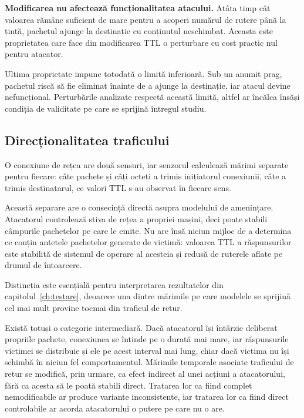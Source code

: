 \textbf{Modificarea nu afectează funcționalitatea atacului.} Atâta timp cât valoarea rămâne suficient de mare pentru a acoperi numărul de rutere până la țintă, pachetul ajunge la destinație cu conținutul neschimbat. Aceasta este proprietatea care face din modificarea TTL o perturbare cu cost practic nul pentru atacator.

Ultima proprietate impune totodată o limită inferioară. Sub un anumit prag, pachetul riscă să fie eliminat înainte de a ajunge la destinație, iar atacul devine nefuncțional. Perturbările analizate respectă această limită, altfel ar încălca însăși condiția de validitate pe care se sprijină întregul studiu.

\subsection{Direcționalitatea traficului}\label{subsec:directionalitate}

O conexiune de rețea are două sensuri, iar senzorul calculează mărimi separate pentru fiecare: câte pachete și câți octeți a trimis inițiatorul conexiunii, câte a trimis destinatarul, ce valori TTL s-au observat în fiecare sens.

Această separare are o consecință directă asupra modelului de amenințare. Atacatorul controlează stiva de rețea a propriei mașini, deci poate stabili câmpurile pachetelor pe care le emite. Nu are însă niciun mijloc de a determina ce conțin antetele pachetelor generate de victimă: valoarea TTL a răspunsurilor este stabilită de sistemul de operare al acesteia și redusă de ruterele aflate pe drumul de întoarcere.

Distincția este esențială pentru interpretarea rezultatelor din capitolul~\ref{ch:testare}, deoarece una dintre mărimile pe care modelele se sprijină cel mai mult provine tocmai din traficul de retur.

Există totuși o categorie intermediară. Dacă atacatorul își întârzie deliberat propriile pachete, conexiunea se întinde pe o durată mai mare, iar răspunsurile victimei se distribuie și ele pe acest interval mai lung, chiar dacă victima nu își schimbă în niciun fel comportamentul. Mărimile temporale asociate traficului de retur se modifică, prin urmare, ca efect indirect al unei acțiuni a atacatorului, fără ca acesta să le poată stabili direct. Tratarea lor ca fiind complet nemodificabile ar produce variante inconsistente, iar tratarea lor ca fiind direct controlabile ar acorda atacatorului o putere pe care nu o are.

